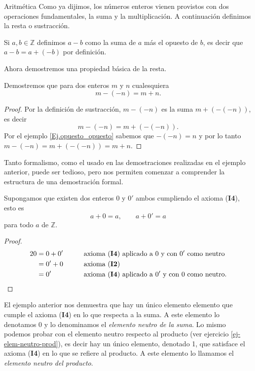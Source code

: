 \begin{section}{Aritmética}
Como ya dijimos, los números enteros vienen provistos con dos operaciones fundamentales, la suma y la multiplicación.
A continuación definimos la resta o sustracción. 

\begin{definicion} Si $a,b\in\mathbb{Z}$ definimos $a-b$ como la suma de $a$ más el opuesto de $b$, es decir que 
$a-b=a+(-b)$ por definición. 
\end{definicion}

Ahora demostremos una propiedad básica de la resta.

\begin{ejemplo} Demostremos que para dos enteros $m$ y $n$ cualesquiera
$$m-(-n) = m+n.$$ 
\end{ejemplo}
\begin{proof} Por la definición de sustracción, $m-(-n)$ es la suma $m+(-(-n))$, es decir 
$$m-(-n)=m+(-(-n)).$$ 
Por el ejemplo \ref{Ej.opuesto_opuesto} sabemos que $-(-n)=n$ y por lo tanto $m-(-n)=m+(-(-n))=m+n$.
\end{proof}

Tanto formalismo, como el usado en las demostraciones realizadas en el ejemplo anterior, puede ser tedioso, pero nos permiten comenzar a comprender la estructura de una demostración formal. 



\begin{ejemplo} Supongamos que existen dos enteros $0$ y $0'$ ambos cumpliendo el
 axioma ({\bf I4}), esto es
$$
a+0= a, \qquad a+0'=a
$$
para todo $a$ de $\mathbb Z$. 
\end{ejemplo}
\begin{proof}
\begin{alignat*}2
0 &= 0 + 0'&\qquad &\text{axioma ({\bf I4}) aplicado a $0$ y con $0'$ como neutro} \\
&=0'+0&\qquad &\text{axioma ({\bf I2})}\\
&= 0' &\qquad &\text{axioma ({\bf I4}) aplicado a $0'$ y con $0$ como neutro}.
\end{alignat*}
\end{proof}


El ejemplo anterior nos demuestra que hay un único elemento elemento que cumple el axioma ({\bf I4}) en lo que respecta a la suma. A este elemento lo denotamos $0$ y lo denominamos el {\em elemento neutro de la suma}. Lo mismo podemos probar con el elemento neutro respecto al producto (ver ejercicio \ref{ej-elem-neutro-prod}),  es decir hay un único elemento,  denotado 1, que satisface el axioma ({\bf I4}) en lo que se refiere al producto. A  este elemento lo llamamos el {\em elemento neutro del producto}.  



\end{section}
